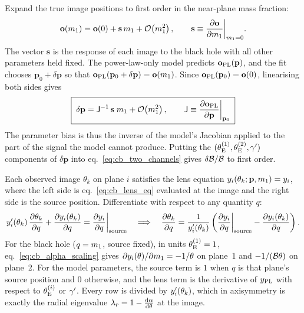 Expand the true image positions to first order in the near-plane mass
fraction:
\begin{equation}
  \mathbf{o}(m_1) = \mathbf{o}(0) + \mathbf{s}\,m_1 + \mathcal{O}\!\left(m_1^2\right),
  \qquad
  \mathbf{s} \equiv \frac{\partial \mathbf{o}}{\partial m_1}\bigg|_{m_1=0}.
\end{equation}
The vector $\mathbf{s}$ is the response of each image to the black hole
with all other parameters held fixed. The power-law-only model predicts
$\mathbf{o}_{\rm PL}(\mathbf{p})$, and the fit chooses
$\mathbf{p}_0+\delta\mathbf{p}$ so that
$\mathbf{o}_{\rm PL}(\mathbf{p}_0+\delta\mathbf{p}) = \mathbf{o}(m_1)$.
Since $\mathbf{o}_{\rm PL}(\mathbf{p}_0)=\mathbf{o}(0)$, linearising both
sides gives
\begin{equation}
  \boxed{\;
  \delta\mathbf{p} = \mathsf{J}^{-1}\,\mathbf{s}\;m_1 + \mathcal{O}\!\left(m_1^2\right),
  \qquad
  \mathsf{J} \equiv \frac{\partial \mathbf{o}_{\rm PL}}{\partial \mathbf{p}}\bigg|_{\mathbf{p}_0}
  \;}
  \label{eq:cb_linear_response}
\end{equation}
The parameter bias is thus the inverse of the model's Jacobian
applied to the part of the signal the model cannot produce. Putting the
$(\theta_{\mathrm{E}}^{(1)},\theta_{\mathrm{E}}^{(2)},\gamma')$ components of $\delta\mathbf{p}$
into eq.~\eqref{eq:cb_two_channels} gives $\delta\mathcal{B}/\mathcal{B}$ to first
order.

\begin{derivation}
Each observed image $\theta_k$ on plane $i$ satisfies the lens equation
$y_i(\theta_k;\mathbf{p},m_1) = y_i$, where the left side is
eq.~\eqref{eq:cb_lens_eq} evaluated at the image and the right side is
the source position. Differentiate with respect to any quantity $q$:
\begin{equation*}
  y_i'(\theta_k)\,\frac{\partial \theta_k}{\partial q} + \frac{\partial y_i(\theta_k)}{\partial q}
  = \frac{\partial y_i}{\partial q}\bigg|_{\rm source}
  \quad\Longrightarrow\quad
  \frac{\partial \theta_k}{\partial q}
  = \frac{1}{y_i'(\theta_k)}
    \left(\frac{\partial y_i}{\partial q}\bigg|_{\rm source}-\frac{\partial y_i(\theta_k)}{\partial q}\right).
\end{equation*}
For the black hole ($q=m_1$, source fixed), in units
$\theta_{\mathrm{E}}^{(1)}=1$, eq.~\eqref{eq:cb_alpha_scaling} gives
$\partial y_i(\theta)/\partial m_1 = -1/\theta$ on plane~1 and
$-1/(\mathcal{B}\theta)$ on plane~2. For the model parameters, the source
term is $1$ when $q$ is that plane's source position and $0$ otherwise,
and the lens term is the derivative of $y_{\rm PL}$ with respect to
$\theta_{\mathrm{E}}^{(i)}$ or $\gamma'$. Every row is divided by $y_i'(\theta_k)$, which in axisymmetry is
exactly the radial eigenvalue $\lambda_r = 1-\frac{\mathrm{d} \alpha}{\mathrm{d} \theta}$ at
the image.
\end{derivation}

